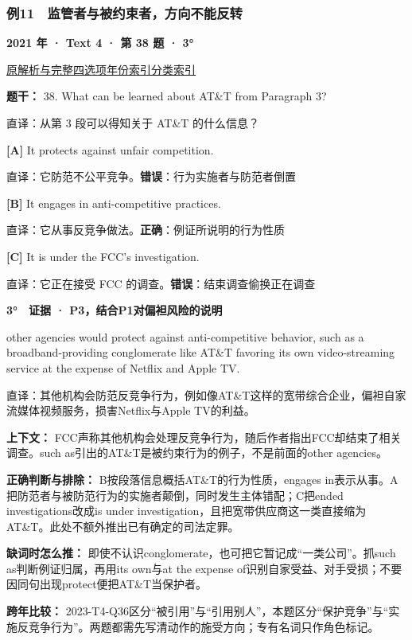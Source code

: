 \documentclass[11pt,a4paper]{article}
\begin{document}
\subsubsection{例11　监管者与被约束者，方向不能反转}\label{case-2021-T4-Q38}
\noindent\textbf{2021 年 · Text 4 · 第 38 题 · 3°}\par\noindent \href{https://zj139.github.io/math-notes/english/fbb30e5f6024dd40ef6ed807/\#q38}{原解析与完整四选项}\quad \hyperref[idx-2021-T4-Q38]{年份索引}\quad \hyperref[class-R05]{分类索引}\par\smallskip
\noindent\textbf{题干：} 38. What can be learned about AT\&T from Paragraph 3?\par\smallskip
直译：从第 3 段可以得知关于 AT\&T 的什么信息？

\noindent\textbf{[A]} It protects against unfair competition.\par\nopagebreak
\noindent 直译：它防范不公平竞争。\quad\textbf{错误}：行为实施者与防范者倒置\par\smallskip
{}\noindent\textbf{[B]} It engages in anti-competitive practices.\par\nopagebreak
\noindent 直译：它从事反竞争做法。\quad\textbf{正确}：例证所说明的行为性质\par\smallskip
{}\noindent\textbf{[C]} It is under the FCC’s investigation.\par\nopagebreak
\noindent 直译：它正在接受 FCC 的调查。\quad\textbf{错误}：结束调查偷换正在调查\par\smallskip
\begin{evidence}\textbf{3°　证据 · P3，结合P1对偏袒风险的说明}\par other agencies would protect against anti-competitive behavior, such as a broadband-providing conglomerate like AT\&T favoring its own video-streaming service at the expense of Netflix and Apple TV.\par 直译：其他机构会防范反竞争行为，例如像AT\&T这样的宽带综合企业，偏袒自家流媒体视频服务，损害Netflix与Apple TV的利益。\end{evidence}
\noindent\textbf{上下文：} FCC声称其他机构会处理反竞争行为，随后作者指出FCC却结束了相关调查。such as引出的AT\&T是被约束行为的例子，不是前面的other agencies。\par\smallskip
\noindent\textbf{正确判断与排除：} B按段落信息概括AT\&T的行为性质，engages in表示从事。A把防范者与被防范行为的实施者颠倒，同时发生主体错配；C把ended investigations改成is under investigation，且把宽带供应商这一类直接缩为AT\&T。此处不额外推出已有确定的司法定罪。\par\smallskip
\noindent\textbf{缺词时怎么推：} 即使不认识conglomerate，也可把它暂记成“一类公司”。抓such as判断例证归属，再用its own与at the expense of识别自家受益、对手受损；不要因同句出现protect便把AT\&T当保护者。\par\smallskip
\noindent\textbf{跨年比较：} 2023-T4-Q36区分“被引用”与“引用别人”，本题区分“保护竞争”与“实施反竞争行为”。两题都需先写清动作的施受方向；专有名词只作角色标记。\par\smallskip
\clearpage
\end{document}
